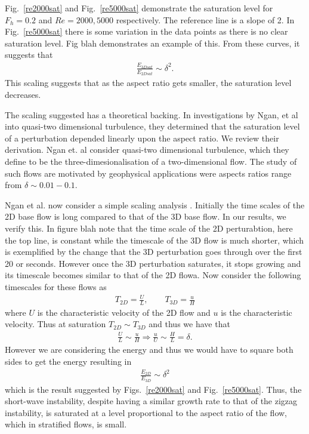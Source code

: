Fig.~\ref{re2000sat} and Fig.~\ref{re5000sat} demonstrate the saturation level for $F_{h}=0.2$ and $Re=2000,5000$ respectively. The reference line is a slope of 2. In Fig.~\ref{re5000sat} there is some variation in the data points as there is no clear saturation level. Fig blah demonstrates an example of this. From these curves, it suggests that  
\begin{align}
\frac{E_{3Dsat}}{E_{2Dsat}} \sim \delta^{2}.
\end{align}
This scaling suggests that as the aspect ratio gets smaller, the saturation level decreases. 

The scaling suggested has a theoretical backing. In investigations by Ngan, et al \cite{ngan2005} into quasi-two dimensional turbulence, they determined that the saturation level of a perturbation depended linearly upon the aspect ratio. We review their derivation. Ngan et. al \cite{ngan2005} consider quasi-two dimensional turbulence, which they define to be the three-dimesionalisation of a two-dimensional flow. The study of such flows are motivated by geophysical applications were aspects ratios range from $\delta\sim 0.01-0.1$\cite{ngan2005}. 

Ngan et al. now consider a simple scaling analysis \cite{ngan2005}. Initially the time scales of the 2D base flow is long compared to that of the 3D base flow. In our results, we verify this. In figure blah note that the time scale of the 2D perturabtion, here the top line, is constant while the timescale of the 3D flow is much shorter, which is exemplified by the change that the 3D perturbation goes through over the first 20 or seconds. However once the 3D perturbation saturates, it stops growing and its timescale becomes similar to that of the 2D flowa.  Now consider the following timescales for these flows \cite{ngan2005} as
\begin{align}
T_{2D} = \frac{U}{L},\qquad T_{3D} =\frac{u}{H}
\end{align}
where $U$ is the characteristic velocity of the 2D flow and $u$ is the characteristic velocity. Thus at saturation $T_{2D}\sim T_{3D}$ and thus we have that
\begin{align}
\frac{U}{L}\sim\frac{u}{H} \Rightarrow \frac{u}{U} \sim \frac{H}{L} = \delta .
\end{align}
However we are considering the energy and thus we would have to square both sides to get the energy resulting in
\begin{align}
\frac{E_{2D}}{E_{3D}} \sim \delta^{2}
\end{align}
which is the result suggested by Figs.~\ref{re2000sat} and Fig.~\ref{re5000sat}. Thus, the short-wave instability, despite having a similar growth rate to that of the zigzag instability, is saturated at a level proportional to the aspect ratio of the flow, which in stratified flows, is small. 


